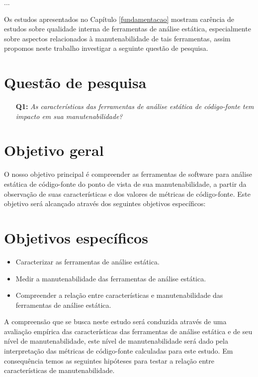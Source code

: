 {...}
\label{planejamento}

Os estudos apresentados no Capítulo \ref{fundamentacao} mostram carência de estudos
sobre qualidade interna de ferramentas de análise estática, especialmente
sobre aspectos relacionados à manutenabilidade de tais ferramentas, assim
propomos neste trabalho investigar a seguinte questão de pesquisa.

\section{Questão de pesquisa}

\begin{enumerate}
  \item [{\bf Q1:}] {\em As características das ferramentas de análise estática
  de código-fonte tem impacto em sua manutenabilidade?}
\end{enumerate}

\section{Objetivo geral}

O nosso objetivo principal é compreender as ferramentas de software
para análise estática de código-fonte do ponto de vista de sua
manutenabilidade, a partir da observação de suas características e dos valores
de métricas de código-fonte. Este objetivo será alcançado através dos
seguintes objetivos específicos:

\section{Objetivos específicos}

\begin{itemize}
  \item Caracterizar as ferramentas de análise estática.
  \item Medir a manutenabilidade das ferramentas de análise estática.
  \item Compreender a relação entre características e manutenabilidade
        das ferramentas de análise estática.
\end{itemize}

A compreensão que se busca neste estudo será conduzida através de uma avaliação
empírica das características das ferramentas de análise estática e de seu nível
de manutenabilidade, este nível de manutenabilidade será dado pela
interpretação das métricas de código-fonte calculadas para este estudo. Em
consequência temos as seguintes hipóteses para testar a relação entre
características de manutenabilidade.

